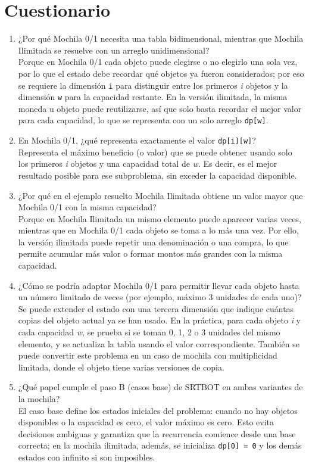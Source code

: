 \documentclass{article}
\begin{document}
\section{Cuestionario}
\begin{enumerate}
    \item ¿Por qué Mochila 0/1 necesita una tabla bidimensional, mientras que Mochila Ilimitada se resuelve con un arreglo unidimensional? \\ 
    Porque en Mochila 0/1 cada objeto puede elegirse o no elegirlo una sola vez, por lo que el estado debe recordar qué objetos ya fueron considerados; por eso se requiere la dimensión \texttt{i} para distinguir entre los primeros \textit{i} objetos y la dimensión \texttt{w} para la capacidad restante. En la versión ilimitada, la misma moneda u objeto puede reutilizarse, así que solo basta recordar el mejor valor para cada capacidad, lo que se representa con un solo arreglo \texttt{dp[w]}.

    \item En Mochila 0/1, ¿qué representa exactamente el valor \texttt{dp[i][w]}? \\ 
    Representa el máximo beneficio (o valor) que se puede obtener usando solo los primeros \textit{i} objetos y una capacidad total de \textit{w}. Es decir, es el mejor resultado posible para ese subproblema, sin exceder la capacidad disponible.

    \item ¿Por qué en el ejemplo resuelto Mochila Ilimitada obtiene un valor mayor que Mochila 0/1 con la misma capacidad? \\ 
    Porque en Mochila Ilimitada un mismo elemento puede aparecer varias veces, mientras que en Mochila 0/1 cada objeto se toma a lo más una vez. Por ello, la versión ilimitada puede repetir una denominación o una compra, lo que permite acumular más valor o formar montos más grandes con la misma capacidad.

    \item ¿Cómo se podría adaptar Mochila 0/1 para permitir llevar cada objeto hasta un número limitado de veces (por ejemplo, máximo 3 unidades de cada uno)? \\ 
    Se puede extender el estado con una tercera dimensión que indique cuántas copias del objeto actual ya se han usado. En la práctica, para cada objeto \textit{i} y cada capacidad \textit{w}, se prueba si se toman 0, 1, 2 o 3 unidades del mismo elemento, y se actualiza la tabla usando el valor correspondiente. También se puede convertir este problema en un caso de mochila con multiplicidad limitada, donde el objeto tiene varias versiones de copia.

    \item ¿Qué papel cumple el paso B (casos base) de SRTBOT en ambas variantes de la mochila? \\ 
    El caso base define los estados iniciales del problema: cuando no hay objetos disponibles o la capacidad es cero, el valor máximo es cero. Esto evita decisiones ambiguas y garantiza que la recurrencia comience desde una base correcta; en la mochila ilimitada, además, se inicializa \texttt{dp[0] = 0} y los demás estados con infinito si son imposibles.
\end{enumerate}
\end{document}
